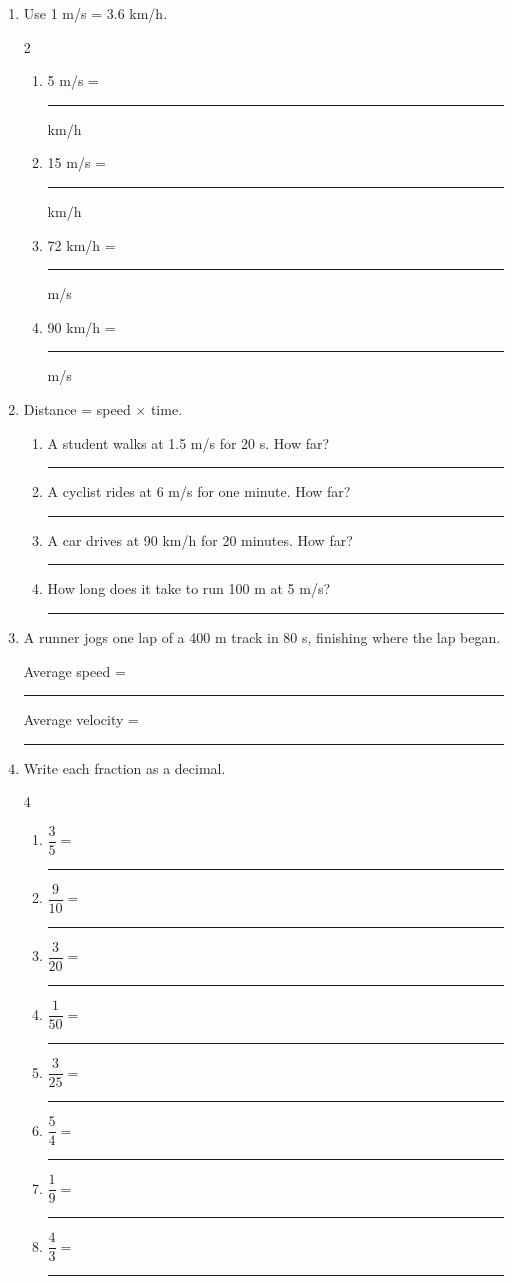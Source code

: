 \documentclass[12pt, twoside]{article}
\newcommand{\blank}[1][2.4cm]{\rule{#1}{0.4pt}}
\begin{document}
\begin{enumerate}[itemsep=0.35cm]
\item Use 1 m/s = 3.6 km/h.
  \begin{multicols}{2}
    \begin{enumerate}[itemsep=0.42cm]
      \item 5 m/s = \blank[1.8cm] km/h
      \item 15 m/s = \blank[1.8cm] km/h
      \item 72 km/h = \blank[1.8cm] m/s
      \item 90 km/h = \blank[1.8cm] m/s
    \end{enumerate}
  \end{multicols}

\item Distance = speed $\times$ time.
  \begin{enumerate}[itemsep=0.42cm]
    \item A student walks at 1.5 m/s for 20 s. How far? \hfill \blank
    \item A cyclist rides at 6 m/s for one minute. How far? \hfill \blank
    \item A car drives at 90 km/h for 20 minutes. How far? \hfill \blank
    \item How long does it take to run 100 m at 5 m/s? \hfill \blank
  \end{enumerate}

\item A runner jogs one lap of a 400 m track in 80 s, finishing where the lap began.

  \vspace{0.3cm}
  Average speed = \blank \hfill Average velocity = \blank

\newpage

\item Write each fraction as a decimal.
  \begin{multicols}{4}
    \begin{enumerate}[itemsep=0.5cm]
      \item $\dfrac{3}{5} = $ \blank[1.6cm]
      \item $\dfrac{9}{10} = $ \blank[1.6cm]
      \item $\dfrac{3}{20} = $ \blank[1.6cm]
      \item $\dfrac{1}{50} = $ \blank[1.6cm]
      \item $\dfrac{3}{25} = $ \blank[1.6cm]
      \item $\dfrac{5}{4} = $ \blank[1.6cm]
      \item $\dfrac{1}{9} = $ \blank[1.6cm]
      \item $\dfrac{4}{3} = $ \blank[1.6cm]
    \end{enumerate}
  \end{multicols}


\end{enumerate}
\end{document}

